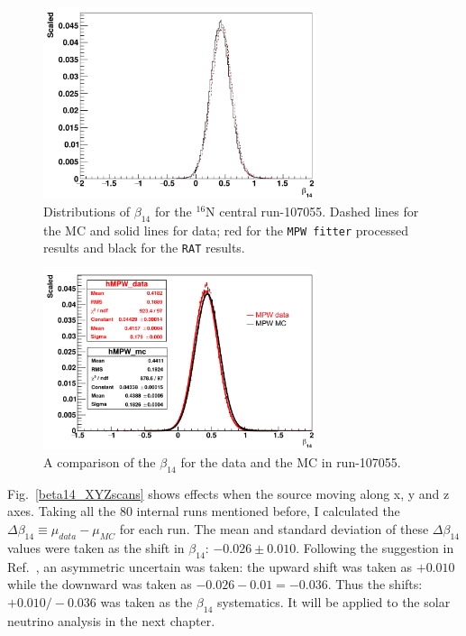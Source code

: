 \begin{figure}[htbp]
	\centering
	\includegraphics[width=8cm]{N16_beta14_107055.png}
	\caption[Distributions of $\beta_{14}$ for the $^{16}$N central run-107055.]{Distributions of $\beta_{14}$ for the $^{16}$N central run-107055. Dashed lines for the MC and solid lines for data; red for the \texttt{MPW fitter} processed results and black for the \texttt{RAT} results.}
	\label{fig:N16beta14}
\end{figure}

\begin{figure}[htbp]
	\centering
	\includegraphics[width=8cm]{N16FitMPW_beta14_107055.png}
	\caption{A comparison of the $\beta_{14}$ for the data and the MC in run-107055.}
	\label{fig:N16beta14MPW}
\end{figure}

Fig.~\ref{beta14_XYZscans} shows effects when the source moving along x, y and z axes. Taking all the 80 internal runs mentioned before, I calculated the $\Delta \beta_{14}\equiv\mu_{data}-\mu_{MC}$ for each run. The mean and standard deviation of these $\Delta \beta_{14}$ values were taken as the shift in $\beta_{14}$: $-0.026\pm0.010$. Following the suggestion in Ref.~\cite{waterunidoc}, an asymmetric uncertain was taken: the upward shift was taken as $+0.010$ while the downward was taken as $-0.026-0.01=-0.036$. Thus the shifts: $+0.010/-0.036$ was taken as the $\beta_{14}$ systematics. It will be applied to the solar neutrino analysis in the next chapter. 

